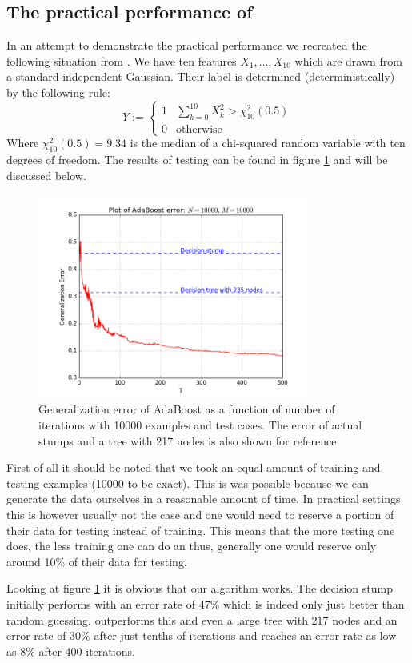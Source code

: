 \subsection{The practical performance of \adaB}
\label{subsec:AdaPracPerf}
In an attempt to demonstrate the practical performance we recreated the following situation from \cite{Hastie2009}. We have ten features $X_1,\ldots,X_{10}$ which are drawn from a standard independent Gaussian. Their label is determined (deterministically) by the following rule: $$Y:=\begin{cases}
1 & \sum_{k=0}^{10} X^2_k > \chi_{10}^2(0.5)\\
0 & \text{otherwise}
\end{cases}$$ Where $\chi_{10}^2(0.5)=9.34$ is the median of a chi-squared random variable with ten degrees of freedom. The results of testing can be found in figure \ref{fig:adaB} and will be discussed below. 

\begin{figure}[!ht]
  \centering
      \includegraphics[width=0.8\textwidth]{generated/prettyLong.png}
  \caption{Generalization error of AdaBoost as a function of number of iterations with 10000 examples and test cases. The error of actual stumps and a tree with 217 nodes is also shown for reference}
      \label{fig:adaB}
\end{figure}

First of all it should be noted that we took an equal amount of training and testing examples (10000 to be exact). This is was possible because we can generate the data ourselves in a reasonable amount of time. In practical settings this is however usually not the case and one would need to reserve a portion of their data for testing instead of training. This means that the more testing one does, the less training one can do an thus, generally one would reserve only around 10\% of their data for testing.
\par Looking at figure \ref{fig:adaB} it is obvious that our algorithm works. The decision stump initially performs with an error rate of 47\% which is indeed only just better than random guessing. \adaB outperforms this and even a large tree with 217 nodes and an error rate of 30\% after just tenths of iterations and reaches an error rate as low as 8\% after 400 iterations. 

